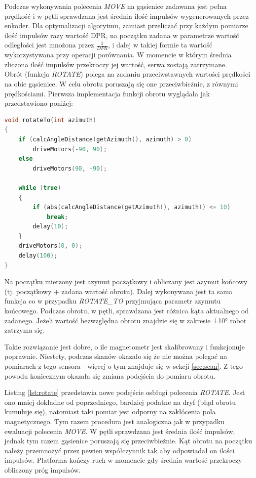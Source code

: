 Podczas wykonywania polecenia \emph{MOVE} na gąsienice zadawana jest pełna prędkość i w pętli sprawdzana jest średnia ilość impulsów wygenerowanych przez enkoder. Dla optymalizacji algorytmu, zamiast przeliczać przy każdym pomiarze ilość impulsów razy wartość DPR, na początku zadana w parametrze wartość odległości jest mnożona przez $\frac{1}{DPR}$, i dalej w takiej formie ta wartość wykorzystywana przy operacji porównania. W momencie w którym średnia zliczona ilość impulsów przekroczy jej wartość, serwa zostają zatrzymane.
\\ 

Obrót (funkcja \emph{ROTATE}) polega na zadaniu przeciwstawnych wartości prędkości na obie gąsienice. W celu obrotu poruszają się one przeciwbieżnie, z równymi prędkościami. Pierwsza implementacja funkcji obrotu wyglądała jak przedstawiono poniżej:

\begin{lstlisting}[basicstyle=\footnotesize\ttfamily,language=c++,caption=Funkcja będąca głównym elementem obsługi poleceń \emph{ROTATE} oraz \emph{ROTATE\_TO},label=lst:rotate-to-function]
void rotateTo(int azimuth)
{
    if (calcAngleDistance(getAzimuth(), azimuth) > 0)
        driveMotors(-90, 90);
    else
        driveMotors(90, -90);

    while (true)
    {
        if (abs(calcAngleDistance(getAzimuth(), azimuth)) <= 10)
            break;
        delay(10);
    }
    driveMotors(0, 0);
    delay(100);
}
\end{lstlisting}

Na początku mierzony jest azymut początkowy i obliczany jest azymut końcowy (tj. początkowy + zadana wartość obrotu). Dalej wykonywana jest ta sama funkcja co w przypadku \emph{ROTATE\_TO} przyjmująca parametr azymutu końcowego. Podczas obrotu, w pętli, sprawdzana jest różnica kąta aktualnego od zadanego. Jeżeli wartość bezwzględna obrotu znajdzie się w zakresie ±10° robot zatrzyma się.

Takie rozwiązanie jest dobre, o ile magnetometr jest skalibrowany i funkcjonuje poprawnie. Niestety, podczas skanów okazało się że nie można polegać na pomiarach z tego sensora - więcej o tym znajduje się w sekcji \ref{sec:scan}. Z tego powodu koniecznym okazała się zmiana podejścia do pomiaru obrotu.

Listing \ref{lst:rotate} przedstawia nowe podejście osbługi polecenia \emph{ROTATE}. Jest ono mniej dokładne od poprzedniego, bardziej podatne na dryf (błąd obrotu kumuluje się), natomiast taki pomiar jest odporny na zakłócenia pola magnetycznego.
Tym razem procedura jest analogiczna jak w przypadku ewaluacji polecenia \emph{MOVE}. W pętli sprawdzana jest średnia ilość impulsów, jednak tym razem gąsienice poruszają się przeciwbieżnie. Kąt obrotu na początku należy przemnożyć przez pewien współczynnik tak aby odpowiadał on ilości impulsów. Platforma kończy ruch w momencie gdy średnia wartość przekroczy obliczony próg impulsów.


